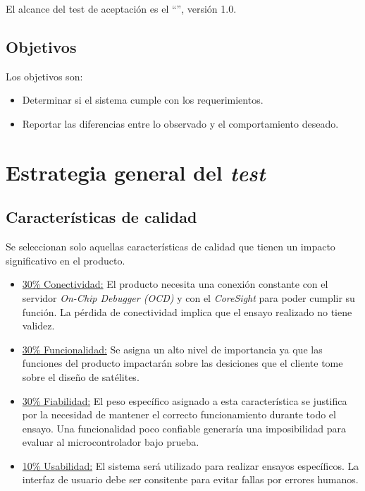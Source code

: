 \documentclass[
    11pt,
    spanish,
	a4paper
]{article}
\begin{document}
El alcance del test de aceptación es el ``\MyTitle '', versión 1.0.

\subsection{Objetivos}
\label{sub:objetivos}

Los objetivos son:

\begin{itemize}
	\item Determinar si el sistema cumple con los requerimientos.
	\item Reportar las diferencias entre lo observado y el comportamiento deseado.
\end{itemize}


\section{Estrategia general del \emph{test}}
\label{sec:estrategia}

\subsection{Características de calidad}
\label{sub:caracteristicasCalidad}

Se seleccionan solo aquellas características de calidad que tienen un impacto significativo en el producto.

\begin{itemize}
    \item \underline{30\% Conectividad:} El producto necesita una conexión constante con el servidor \emph{On-Chip Debugger (OCD)} y con el \emph{CoreSight} para poder cumplir su función. La pérdida de conectividad implica que el ensayo realizado no tiene validez.
    \item \underline{30\% Funcionalidad:} Se asigna un alto nivel de importancia ya que las funciones del producto impactarán sobre las desiciones que el cliente tome sobre el diseño de satélites.
    \item \underline{30\% Fiabilidad:} El peso específico asignado a esta característica se justifica por la necesidad de mantener el correcto funcionamiento durante todo el ensayo. Una funcionalidad poco confiable generaría una imposibilidad para evaluar al microcontrolador bajo prueba.
    \item \underline{10\% Usabilidad:} El sistema será utilizado para realizar ensayos específicos. La interfaz de usuario debe ser consitente para evitar fallas por errores humanos.
\end{itemize}
\end{document}

